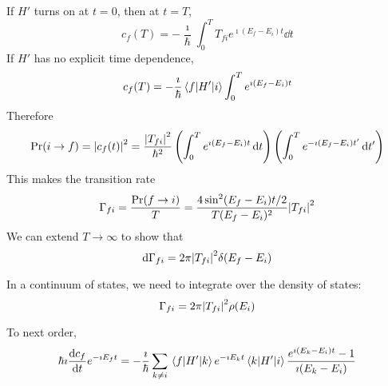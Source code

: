 \documentclass[a4paper,twoside,master.tex]{subfiles}
\begin{document}
If $ H' $ turns on at $ t=0 $, then at $ t = T $, 
\begin{equation}
    c_f(T) = - \frac{\imath}{\hbar} \int_0^T T_{f i} e^{\imath (E_f - E_i) t} \dd{t}
\end{equation}
If $ H' $ has no explicit time dependence,
\begin{equation}
    c_f(T) = - \frac{\imath}{\hbar} \mel{f}{H'}{i} \int_0^T e^{\imath (E_f - E_i) t}
\end{equation}
Therefore
\begin{equation}
    \Pr(i \to f) = \abs{c_f(t)}^2 = \frac{\abs{T_{f i}}^2}{\hbar^2} \left( \int_0^T e^{\imath (E_f - E_i) t} \dd{t} \right)\left( \int_0^T e^{-\imath (E_f - E_i) t'} \dd{t'} \right)
\end{equation}
This makes the transition rate
\begin{equation}
    \Gamma_{f i} = \frac{\Pr(f \to i)}{T} = \frac{4 \sin[2](E_f - E_i) t / 2}{T(E_f - E_i)^2} \abs{T_{f i}}^2
\end{equation}
We can extend $ T \to \infty $ to show that
\begin{equation}
    \dd{\Gamma_{f i}} = 2 \pi \abs{T_{f i}}^2 \delta(E_f - E_i)
\end{equation}

In a continuum of states, we need to integrate over the density of states:
\begin{equation}
    \Gamma_{f i} = 2 \pi \abs{T_{f i}}^2 \rho(E_i)
\end{equation}

To next order,
\begin{equation}
    \hbar \imath \dv{c_f}{t} e^{- \imath E_f t} = - \frac{\imath}{\hbar} \sum_{k \neq i} \mel{f}{H'}{k} e^{- \imath E_k t} \mel{k}{H'}{i} \frac{e^{\imath (E_k - E_i) t}-1}{\imath(E_k - E_i)}
\end{equation}
\end{document}
